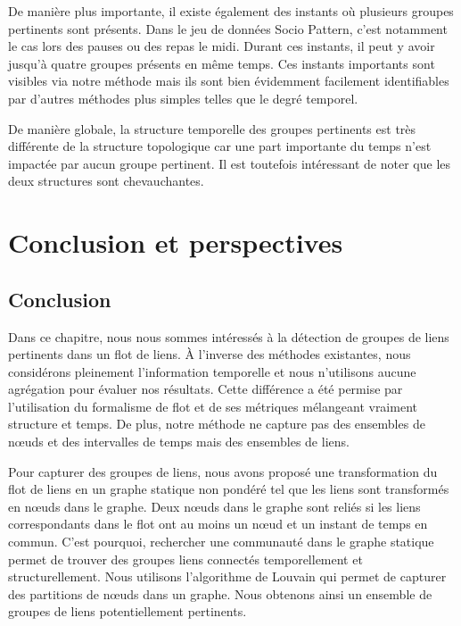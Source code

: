 De manière plus importante, il existe également des instants où plusieurs groupes pertinents sont présents.
Dans le jeu de données Socio Pattern, c'est notamment le cas lors des pauses ou des repas le midi.
Durant ces instants, il peut y avoir jusqu'à quatre groupes présents en même temps.
Ces instants importants sont visibles via notre méthode mais ils sont bien évidemment facilement identifiables par d'autres méthodes plus simples telles que le degré temporel.

De manière globale, la structure temporelle des groupes pertinents est très différente de la structure topologique car une part importante du temps n'est impactée par aucun groupe pertinent.
Il est toutefois intéressant de noter que les deux structures sont chevauchantes. 



\section{Conclusion et perspectives}
\subsection{Conclusion}

Dans ce chapitre, nous nous sommes intéressés à la détection de groupes de liens pertinents dans un flot de liens.
\`A l'inverse des méthodes existantes, nous considérons pleinement l'information temporelle et nous n'utilisons aucune agrégation pour évaluer nos résultats.
Cette différence a été permise par l'utilisation du formalisme de flot et de ses métriques mélangeant vraiment structure et temps.
De plus, notre méthode ne capture pas des ensembles de n\oe uds et des intervalles de temps mais des ensembles de liens.

Pour capturer des groupes de liens, nous avons proposé une transformation du flot de liens en un graphe statique non pondéré tel que les liens sont transformés en n\oe uds dans le graphe.
Deux n\oe uds dans le graphe sont reliés si les liens correspondants dans le flot ont au moins un n\oe ud et un instant de temps en commun.
C'est pourquoi, rechercher une communauté dans le graphe statique permet de trouver des groupes liens connectés temporellement et structurellement.
Nous utilisons l'algorithme de Louvain qui permet de capturer des partitions de n\oe uds dans un graphe.
Nous obtenons ainsi un ensemble de groupes de liens potentiellement pertinents.

